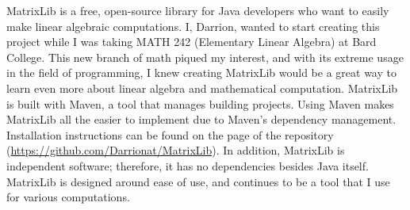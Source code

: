 MatrixLib is a free, open-source library for Java developers who want to easily make linear algebraic computations.
I, Darrion, wanted to start creating this project while I was taking MATH 242 (Elementary Linear Algebra) at Bard College.
This new branch of math piqued my interest, and with its extreme usage in the field of programming, I knew creating MatrixLib would be a great way to learn even more about linear algebra and mathematical computation.
MatrixLib is built with Maven, a tool that manages building projects.
Using Maven makes MatrixLib all the easier to implement due to Maven's dependency management.
Installation instructions can be found on the page of the repository (\href{https://github.com/Darrionat/MatrixLib}{https://github.com/Darrionat/MatrixLib}).
In addition, MatrixLib is independent software; therefore, it has no dependencies besides Java itself.
MatrixLib is designed around ease of use, and continues to be a tool that I use for various computations.
